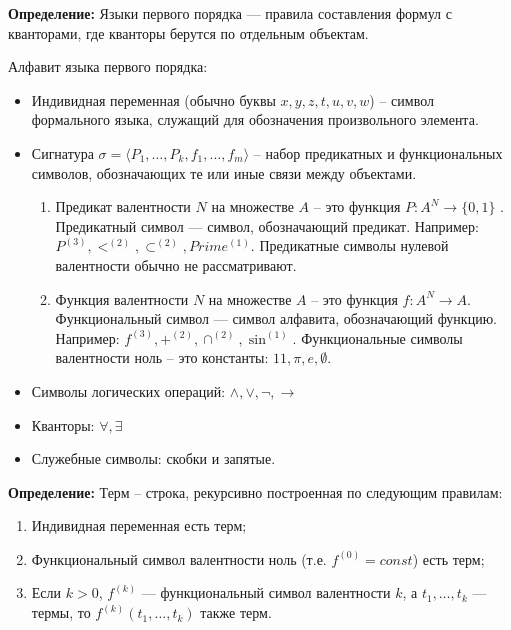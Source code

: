 \textbf{Определение:} Языки первого порядка — правила составления формул с кванторами, где кванторы берутся по отдельным объектам.
\newline \par \noindent Алфавит языка первого порядка:
\begin{itemize}
    \item Индивидная переменная (обычно буквы $x, y, z, t, u, v, w$) -- символ формального языка, служащий для обозначения произвольного элемента.
    \item Сигнатура $\sigma = \langle P_1,\ldots, P_k,f_1,\ldots,f_m \rangle$ -- набор предикатных и функциональных символов, обозначающих те или иные связи между объектами. 
    \begin{enumerate}
        \item Предикат валентности $N$ на множестве $A$ -- это функция $P:A^N\to \{0,1\}$ .
        \newline Предикатный символ — символ, обозначающий предикат. 
        \newline Например: $P^{(3)}, <^{(2)}, \subset ^{(2)}, Prime^{(1)}$.
        \newline Предикатные символы нулевой валентности обычно не рассматривают.
        
        \item Функция валентности $N$ на множестве $A$ -- это функция $f:A^N\to A$.
        \newline Функциональный символ — символ алфавита, обозначающий функцию.
        \newline Например: $f^{(3)}, +^{(2)}, \cap ^{(2)}, \sin^{(1)}$.
        \newline Функциональные символы валентности ноль -- это константы: $11, \pi, e, \emptyset$.
    \end{enumerate}
    
    \item Символы логических операций: $\land, \lor, \neg, \to$
    \item Кванторы: $\forall, \exists$
    \item Служебные символы: скобки и запятые.
\end{itemize}

\textbf{Определение:} Терм -- строка, рекурсивно построенная по следующим правилам:
\begin{enumerate}
    \item Индивидная переменная есть терм;
    \item Функциональный символ валентности ноль (т.е. $f^{(0)}=const$) есть терм;
    \item Если $k > 0$, $f^{(k)}$ — функциональный символ валентности $k$, а $t_1,\ldots,t_k$ — термы, то $f^{(k)}(t_1, \ldots,t_k)$ также терм.
\end{enumerate}

